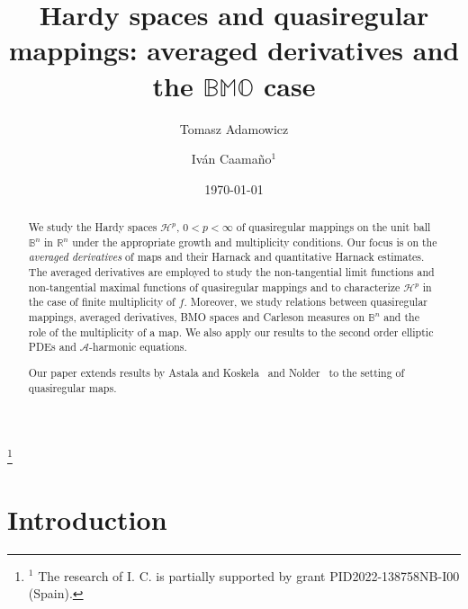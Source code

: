 \documentclass[11pt,a4paper,reqno]{amsart}
\theoremstyle{definition}
\newcommand{\B}{\mathbb{B}^n}
\newcommand{\Rn}{{\mathbb R}^n}
\newcommand{\Hp}{\mathcal{H}^p}
\newcommand{\A}{\mathcal{A}}
\numberwithin{komcounter}{section}
\begin{document}
\title[Hardy spaces and quasiregular mappings: averaged derivatives and the BMO case]{Hardy spaces and quasiregular mappings: averaged derivatives and the $\mathbb{BMO}$ case}
\author[T.\ Adamowicz]{Tomasz Adamowicz}
\address{The Institute of Mathematics, Polish Academy of Sciences \\ ul. \'Sniadeckich 8, 00-656 Warsaw, Poland}
\author[I. Caama\~{n}o]{Iv\'an Caama\~{n}o{\small$^1$}}
\address{The Institute of Mathematics, Polish Academy of Sciences \\ ul. \'Sniadeckich 8, 00-656 Warsaw, Poland}

\thanks{{\small$^1$}
The research of I. C. is partially supported by grant PID2022-138758NB-I00 (Spain).}
\date{\today}

\begin{abstract}
 We study the Hardy spaces $\Hp$, $0<p<\infty$ of quasiregular mappings on the unit ball $\B$ in $\Rn$ 
under the appropriate growth and multiplicity conditions. Our focus is on the \emph{averaged derivatives} of maps and their Harnack and quantitative Harnack estimates. The averaged derivatives are employed to study the non-tangential limit functions and non-tangential maximal functions of quasiregular mappings and to characterize $\Hp$ in the case of finite multiplicity of $f$. Moreover, we study relations between quasiregular mappings, averaged derivatives, BMO spaces and Carleson measures on $\B$ and the role of the multiplicity of a map. We also apply our results to the second order elliptic PDEs and $\A$-harmonic equations. 

Our paper extends results by Astala and Koskela~\cite{ak} and Nolder~\cite{no} to the setting of quasiregular maps.
\end{abstract}
	
\maketitle

\tableofcontents


\section{Introduction}
\end{document}
